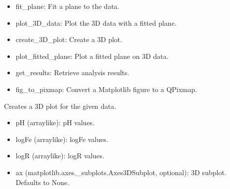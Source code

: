 \documentclass[a4paper,10pt,english]{sphinxmanual}
\begin{document}
\begin{fulllineitems}
\begin{description}
\begin{itemize}
\item {} 
\sphinxAtStartPar
fit\_plane: Fit a plane to the data.

\item {} 
\sphinxAtStartPar
plot\_3D\_data: Plot the 3D data with a fitted plane.

\item {} 
\sphinxAtStartPar
create\_3D\_plot: Create a 3D plot.

\item {} 
\sphinxAtStartPar
plot\_fitted\_plane: Plot a fitted plane on 3D data.

\item {} 
\sphinxAtStartPar
get\_results: Retrieve analysis results.

\item {} 
\sphinxAtStartPar
fig\_to\_pixmap: Convert a Matplotlib figure to a QPixmap.

\end{itemize}

\end{description}

\begin{fulllineitems}
\label{\detokenize{utils:src.utils.plane3D_plot.Plane3DPlotter.create_3D_plot}}
\pysigstartsignatures
{}
\pysigstopsignatures
\sphinxAtStartPar
Creates a 3D plot for the given data.
\begin{description}
\begin{itemize}
\item {} 
\sphinxAtStartPar
pH (array\sphinxhyphen{}like): pH values.

\item {} 
\sphinxAtStartPar
logFe (array\sphinxhyphen{}like): logFe values.

\item {} 
\sphinxAtStartPar
logR (array\sphinxhyphen{}like): logR values.

\item {} 
\sphinxAtStartPar
ax (matplotlib.axes.\_subplots.Axes3DSubplot, optional): 3D subplot. Defaults to None.

\end{itemize}


\end{description}
\end{fulllineitems}
\end{fulllineitems}
\end{document}
